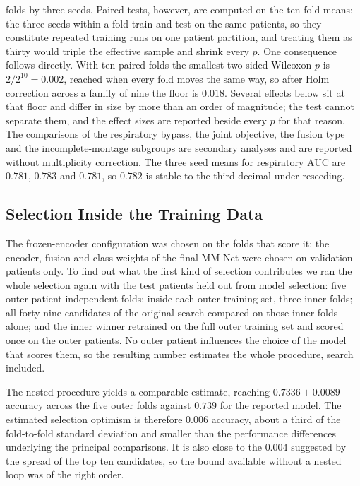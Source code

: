 \documentclass{ieeeaccess}
\newcommand{\fzAcc}{0.739}
\newcommand{\fzAuc}{0.782}
\begin{document}
folds by three seeds. Paired tests, however, are computed on the ten fold-means: the three
seeds within a fold train and test on the same patients, so they constitute repeated training
runs on one patient partition, and treating them as thirty would triple
the effective sample and shrink every $p$. One consequence follows directly. With
ten paired folds the smallest two-sided Wilcoxon $p$ is $2/2^{10}=0.002$, reached when every
fold moves the same way, so after Holm correction across a family of nine the floor is
$0.018$. Several effects below sit at that floor and differ in size by more than an order of
magnitude; the test cannot separate them, and the effect sizes are reported beside every
$p$ for that reason. The comparisons of the respiratory bypass, the joint objective, the fusion
type and the incomplete-montage subgroups are secondary analyses and are reported without
multiplicity correction. The three seed means for respiratory AUC are
$0.781$, $0.783$ and $0.781$, so $\fzAuc$ is stable to the third decimal under reseeding.

\subsection{Selection Inside the Training Data}
\label{sec:nested}
The frozen-encoder configuration was chosen on the folds that score it; the encoder, fusion and
class weights of the final MM-Net were chosen on validation patients only. To find
out what the first kind of selection contributes we ran the whole selection again with the test patients held out
from model selection:
five outer patient-independent folds; inside each outer training set, three inner folds; all
forty-nine candidates of the original search compared on those inner folds alone; and the
inner winner retrained on the full outer training set and scored once on the outer patients.
No outer patient influences the choice of the model that scores them, so the resulting number
estimates the whole procedure, search included.

The nested procedure yields a comparable estimate, reaching
$0.7336 \pm 0.0089$ accuracy across the five outer folds against $\fzAcc$ for the reported
model. The estimated selection optimism is therefore $0.006$ accuracy, about a third of the
fold-to-fold standard
deviation and smaller than the performance differences underlying the principal comparisons.
It is also close
to the $0.004$ suggested by the spread of the top ten candidates, so the bound available
without a nested loop was of the right order.
\end{document}
